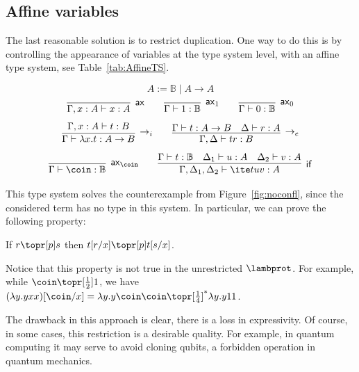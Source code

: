 \subsection{Affine variables}\label{sec:affine}
The last reasonable solution is to restrict duplication. One way to do this is by controlling the appearance of variables at the type system level, with an affine type system, see Table~\ref{tab:AffineTS}.

\begin{table}[t]
  \[
    A:= \mathbb{B}  \mid A\rightarrow A
  \]
  \[
    \infer[\mathsf{ax}]{\Gamma,x:A\vdash x:A}{} 
    \qquad
    \infer[\mathsf{ax}_1]{\Gamma\vdash 1:\mathbb{B}}{}
    \qquad
    \infer[\mathsf{ax}_0]{\Gamma\vdash 0:\mathbb{B}}{}
  \]
  \[
    \infer[\rightarrow_i]{\Gamma\vdash\lambda x.t:A\rightarrow B}
    	{\Gamma,x:A\vdash t:B}
	  \qquad 
    \infer[\rightarrow_e]{\Gamma,\Delta\vdash tr:B}
    	{\Gamma\vdash t:A\rightarrow B & \Delta\vdash r:A}
  \]
  \[
    \infer[\mathsf{ax}_{\coin}]{\Gamma\vdash \coin:\mathbb{B}}{} 
    \qquad
    \infer[\mathsf{if}]{\Gamma,\Delta_1,\Delta_2\vdash\ite t u v:A}{\Gamma\vdash t:\mathbb{B}& \Delta_1\vdash u:A & \Delta_2\vdash v:A}    
  \]
  \caption{Affine type system for $\lambprot$
  (different contexts are considered to be disjoint).
  }
  \label{tab:AffineTS}
\end{table}

This type system solves the counterexample from Figure~\ref{fig:noconfl}, since the considered term has no type in this system. In particular, we can prove the following property:
\begin{lem}
  If $r\topr[p] s$ then $t[r/x]\topr[p] t[s/x]$.
\end{lem}
Notice that this property is not true in the unrestricted $\lambprot$. For example, while $\coin\topr[\frac 12]1$, we have $(\lambda y.yxx)[\coin/x]=\lambda y.y\coin\coin\topr[\frac 14]^*\lambda y.y11$.

The drawback in this approach is clear, there is a loss in expressivity. Of course, in some cases, this restriction is a desirable quality. For example, in quantum computing it may serve to avoid cloning qubits, a forbidden operation in quantum mechanics.
